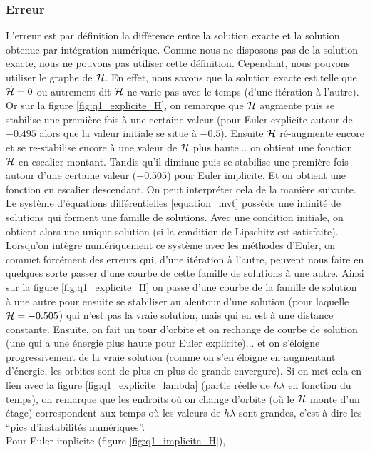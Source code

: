 \subsubsection{Erreur}
L'erreur est par définition la différence entre la solution exacte et la solution obtenue par intégration numérique.
Comme nous ne disposons pas de la solution exacte, nous ne pouvons pas utiliser cette définition. Cependant, nous pouvons utiliser le graphe de $\mathcal{H}$.
En effet, nous savons que la solution exacte est telle que $\dot{\mathcal{H}} = 0$ ou autrement dit $\mathcal{H}$ ne varie pas avec le temps (d'une itération à l'autre).
Or sur la figure \ref{fig:q1_explicite_H}, on remarque que $\mathcal{H}$ augmente puis se stabilise une première fois à une certaine valeur (pour Euler explicite autour de $-0.495$ alors que la valeur initiale se situe à $-0.5$). Ensuite $\mathcal{H}$ ré-augmente encore et se re-stabilise encore à une valeur de $\mathcal{H}$ plus haute... on obtient une fonction $\mathcal{H}$ en escalier montant. Tandis qu'il diminue puis se stabilise une première fois autour d'une certaine valeur ($-0.505$) pour Euler implicite. Et on obtient une fonction en escalier descendant.
On peut interpréter cela de la manière suivante.
Le système d'équations différentielles \ref{equation_mvt} possède une infinité de solutions qui forment une famille de solutions.
Avec une condition initiale, on obtient alors une unique solution (si la condition de Lipschitz est satisfaite).
Lorsqu'on intègre numériquement ce système avec les méthodes d'Euler,
on commet forcément des erreurs qui, d'une itération à l'autre, peuvent
nous faire en quelques sorte passer d'une courbe de cette famille de solutions à une autre.
Ainsi sur la figure \ref{fig:q1_explicite_H} on passe d'une courbe de la famille de solution à une autre pour ensuite se stabiliser au alentour d'une solution (pour laquelle $\mathcal{H}=-0.505$) qui n'est pas la vraie solution,
mais qui en est à une distance constante. Ensuite, on fait un tour d'orbite et on rechange de courbe de solution (une qui a une énergie plus haute pour Euler explicite)... et on s'éloigne progressivement de la vraie solution (comme on s'en éloigne en augmentant d'énergie, les orbites sont de plus en plus de grande envergure). Si on met cela en lien avec la figure \ref{fig:q1_explicite_lambda} (partie réelle de $h\lambda$ en fonction du temps), on remarque que les endroits où on change d'orbite (où le $\mathcal{H}$ monte d'un étage) correspondent aux temps où les valeurs de $h \lambda $ sont grandes, c'est à dire les ``pics d'instabilités numériques''. \\
Pour Euler implicite (figure \ref{fig:q1_implicite_H}),
